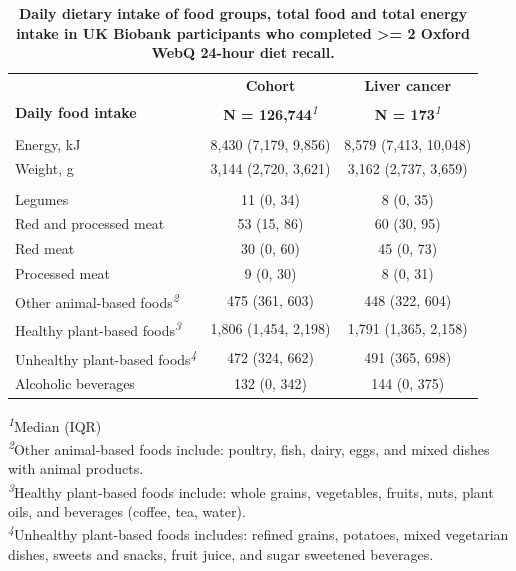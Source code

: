 \documentclass[sn-basic,Numbered,iicol,pdflatex]{sn-jnl}
\begin{document}
\begin{table}[!t]
\caption{{\small \textbf{Daily dietary intake of food groups, total food and total energy intake in UK Biobank participants who completed \textgreater{}= 2 Oxford WebQ 24-hour diet recall.}}}\label{tab2}
\begin{tabular*}{1\linewidth}{@{\extracolsep{\fill}}lcc}
\toprule
 & \textbf{Cohort} & \textbf{Liver cancer} \\ 
\cmidrule(lr){2-2} \cmidrule(lr){3-3}
\textbf{Daily food intake} & \textbf{N = 126,744}\textsuperscript{\textit{1}} & \textbf{N = 173}\textsuperscript{\textit{1}} \\ 
\midrule\addlinespace[2.5pt]
\multicolumn{3}{l}{{\bfseries Total food intake}} \\ 
\midrule\addlinespace[2.5pt]
Energy, kJ & 8,430 (7,179, 9,856) & 8,579 (7,413, 10,048) \\ 
Weight, g & 3,144 (2,720, 3,621) & 3,162 (2,737, 3,659) \\ 
\midrule\addlinespace[2.5pt]
\multicolumn{3}{l}{{\bfseries Food groups, g/day}} \\ 
\midrule\addlinespace[2.5pt]
Legumes & 11 (0, 34) & 8 (0, 35) \\ 
Red and processed meat & 53 (15, 86) & 60 (30, 95) \\ 
Red meat & 30 (0, 60) & 45 (0, 73) \\ 
Processed meat & 9 (0, 30) & 8 (0, 31) \\ 
Other animal-based foods\textsuperscript{\textit{2}} & 475 (361, 603) & 448 (322, 604) \\ 
Healthy plant-based foods\textsuperscript{\textit{3}} & 1,806 (1,454, 2,198) & 1,791 (1,365, 2,158) \\ 
Unhealthy plant-based foods\textsuperscript{\textit{4}} & 472 (324, 662) & 491 (365, 698) \\ 
Alcoholic beverages & 132 (0, 342) & 144 (0, 375) \\ 
\bottomrule
\end{tabular*}
\begin{minipage}{\linewidth}
\textsuperscript{\textit{1}}Median (IQR)\\
\textsuperscript{\textit{2}}Other animal-based foods include: poultry, fish, dairy, eggs, and mixed dishes with animal products.\\
\textsuperscript{\textit{3}}Healthy plant-based foods include: whole grains, vegetables, fruits, nuts, plant oils, and beverages (coffee, tea, water).\\
\textsuperscript{\textit{4}}Unhealthy plant-based foods includes: refined grains, potatoes, mixed vegetarian dishes, sweets and snacks, fruit juice, and sugar sweetened beverages.\\
\end{minipage}
\end{table}
\end{document}
